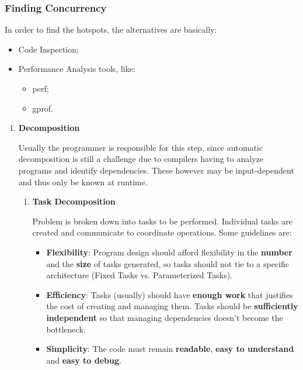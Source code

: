 \subsubsection{Finding Concurrency}
\par In order to find the hotspots, the alternatives are basically:
\begin{itemize}
    \item Code Inspection;
    \item Performance Analysis tools, like:
    \begin{itemize}
        \item perf;
        \item gprof.
    \end{itemize}
\end{itemize}
\begin{enumerate}
    \item \textbf{Decomposition}
    \par Usually the programmer is responsible for this step, since automatic decomposition is still a challenge due to compilers having to analyze programs and identify dependencies. These however may be input-dependent and thus only be known at runtime.
    \begin{enumerate}
        \item \textbf{Task Decomposition}
        \par Problem is broken down into tasks to be performed. Individual tasks are created and communicate to coordinate operations. Some guidelines are:
        \begin{itemize}
            \item \textbf{Flexibility}: Program design should afford flexibility in the \textbf{number} and the \textbf{size} of tasks generated, so tasks should not tie to a specific architecture (Fixed Tasks vs. Parameterized Tasks).
            \item \textbf{Efficiency}: Tasks (usually) should have \textbf{enough work} that justifies the cost of creating and managing them. Tasks should be \textbf{sufficiently independent} so that managing dependencies doesn’t become the bottleneck.
            \item \textbf{Simplicity}: The code must remain \textbf{readable}, \textbf{easy to understand} and \textbf{easy to debug}.
        \end{itemize}
%
\clearpage

\end{enumerate}
\end{enumerate}
